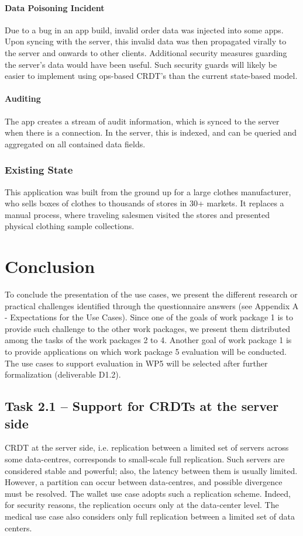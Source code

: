 \documentclass[11pt,a4paper]{report}
\begin{document}
\subsubsection{Data Poisoning Incident}
Due to a bug in an app build, invalid order data was injected into some apps. Upon syncing with the server, this invalid data was then propagated virally to the server and onwards to other clients.
Additional security measures guarding the server's data would have been useful. Such security guards will likely be easier to implement using ops-based CRDT's than the current state-based model.
\subsubsection{Auditing}

The app creates a stream of audit information, which is synced to the server when there is a connection. In the server, this is indexed, and can be queried and aggregated on all contained data fields.

\subsection{Existing State}
This application was built from the ground up for a large clothes manufacturer, who sells boxes of clothes to thousands of stores in 30+ markets.
It replaces a manual process, where traveling salesmen visited the stores and presented physical clothing sample collections.

\chapter{Conclusion}
To conclude the presentation of the use cases, we present the different research or practical challenges identified through the questionnaire answers (see Appendix A - Expectations for the Use Cases). Since one of the goals of work package 1 is to provide such challenge to the other work packages, we present them distributed among the tasks of the work packages 2 to 4. Another goal of work package 1 is to provide applications on which work package 5 evaluation will be conducted. The use cases to support evaluation in WP5 will be selected after further formalization (deliverable D1.2).  

\section{Task 2.1 -- Support for CRDTs at the server side }
CRDT at the server side, i.e. replication between a limited set of servers across some data-centres, corresponds to small-scale full replication. Such servers are considered stable and powerful; also, the latency between them is usually limited. However, a partition can occur between data-centres, and possible divergence must be resolved.   
The wallet use case adopts such a replication scheme. Indeed, for security reasons, the replication occurs only at the data-center level.
The medical use case also considers only full replication between a limited set of data centers.
\end{document}
